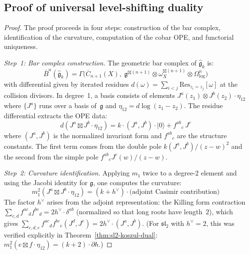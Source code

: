 \subsection{Proof of universal level-shifting duality}

\begin{proof}
The proof proceeds in four steps: construction of the bar complex, identification of the curvature, computation of the cobar OPE, and functorial uniqueness.

\emph{Step~1: Bar complex construction.}
The geometric bar complex of $\widehat{\mathfrak{g}}_k$ is:
\begin{equation}
\bar{B}^n(\widehat{\mathfrak{g}}_k) = \Gamma\bigl(\overline{C}_{n+1}(X),\; \mathfrak{g}^{\boxtimes(n+1)} \otimes \omega_X^{\boxtimes(n+1)} \otimes \Omega^n_{\log}\bigr)
\end{equation}
with differential given by iterated residues $d(\omega) = \sum_{i < j} \mathrm{Res}_{z_i=z_j}[\omega]$ at the collision divisors.  In degree~1, a basis consists of elements $J^a(z_1) \otimes J^b(z_2) \cdot \eta_{12}$ where $\{J^a\}$ runs over a basis of~$\mathfrak{g}$ and $\eta_{12} = d\log(z_1 - z_2)$.  The residue differential extracts the OPE data:
\begin{equation}\label{eq:bar-diff-general}
d(J^a \boxtimes J^b \cdot \eta_{12}) = k \cdot (J^a, J^b) \cdot |0\rangle + f^{ab}{}_{c}\, J^c
\end{equation}
where $(J^a, J^b)$ is the normalized invariant form and $f^{ab}{}_c$ are the structure constants.  The first term comes from the double pole $k(J^a, J^b)/(z-w)^2$ and the second from the simple pole $f^{ab}{}_c J^c(w)/(z-w)$.

\emph{Step~2: Curvature identification.}
Applying $m_1$ twice to a degree-2 element and using the Jacobi identity for $\mathfrak{g}$, one computes the curvature:
\begin{equation}\label{eq:d-squared-general}
m_1^2(J^a \boxtimes J^b \cdot \eta_{12}) = (k + h^\vee) \cdot \bigl(\text{adjoint Casimir contribution}\bigr)
\end{equation}
The factor $h^\vee$ arises from the adjoint representation: the Killing form contraction $\sum_{c,d} f^{ac}{}_d f^{bc}{}_d = 2h^\vee \cdot \delta^{ab}$ (normalized so that long roots have length~$2$), which gives $\sum_{c,d,e} f^{ac}{}_d f^{bc}{}_e (J^d, J^e) = 2h^\vee \cdot (J^a, J^b)$.  (For $\mathfrak{sl}_2$ with $h^\vee = 2$, this was verified explicitly in Theorem~\ref{thm:sl2-koszul-dual}: $m_1^2(e \boxtimes f \cdot \eta_{12}) = (k+2) \cdot \partial h$.)


\end{proof}
